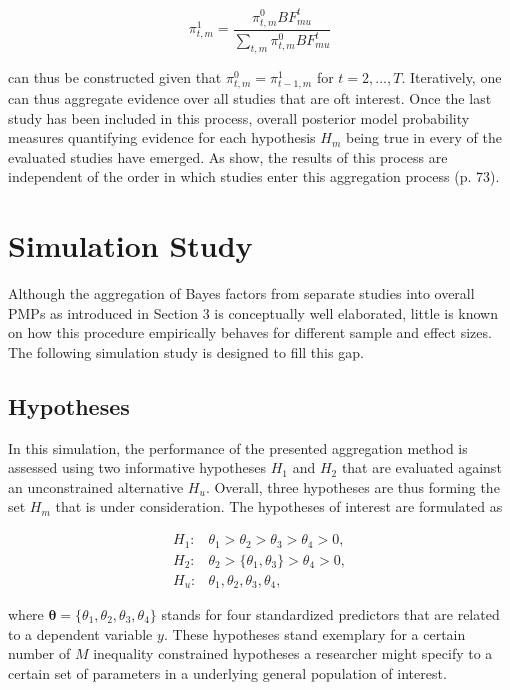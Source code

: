 \documentclass[11pt, a4paper]{article} %
\begin{document}
\begin{equation}
\pi^1_{t,m} = \frac{\pi^0_{t,m} BF^t_{mu}}{\sum_{t,m} \pi^0_{t,m} BF^t_{mu}}
\end{equation}

\noindent can thus be constructed given that $\pi^0_{t,m}=\pi^1_{t-1,m}$ for $t=2,...,T$. Iteratively, one can thus aggregate evidence over all studies that are oft interest. Once the last study has been included in this process, overall posterior model probability measures quantifying evidence for each hypothesis $H_m$ being true in every of the evaluated studies have emerged. As \cite{Kuiper2013} show, the results of this process are independent of the order in which studies enter this aggregation process (p. 73). 

\section{Simulation Study}
Although the aggregation of Bayes factors from separate studies into overall PMPs as introduced in Section 3 is conceptually well elaborated, little is known on how this procedure empirically behaves for different sample and effect sizes. The following simulation study is designed to fill this gap.  

\subsection{Hypotheses}

\noindent In this simulation, the performance of the presented aggregation method is assessed using two informative hypotheses $H_1$ and $H_2$ that are evaluated against an unconstrained alternative $H_u$. Overall, three hypotheses are thus forming the set $H_m$ that is under consideration. The hypotheses of interest are formulated as

\begin{equation}
\begin{aligned}
H_1: & \theta_1>\theta_2>\theta_3>\theta_4 > 0, \\
H_2: & \theta_2>\{\theta_1 , \theta_3\}>\theta_4 > 0, \\
H_u: & \theta_1,\theta_2,\theta_3,\theta_4,
\end{aligned}
\end{equation}

\noindent where $\bm{\theta}=\{\theta_1, \theta_2, \theta_3, \theta_4\}$ stands for four standardized predictors that are related to a dependent variable $y$. These hypotheses stand exemplary for a certain number of $M$ inequality constrained hypotheses a researcher might specify to a certain set of parameters in a underlying general population of interest. \\
\end{document}
